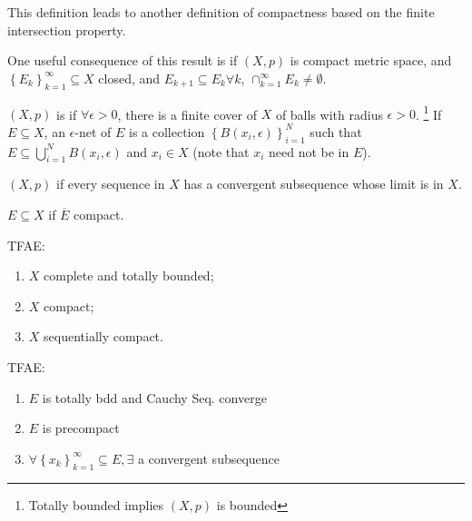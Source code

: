 \begin{rem}
    This definition leads to another definition of compactness 
    based on the finite intersection property.
\end{rem}

One useful consequence of this result is if $(X, p)$ is compact metric space, and 
$\left\{ E_k \right\}_{k = 1}^{\infty} \subseteq X$ closed, and $E_{k + 1} \subseteq E_k \forall k$, 
$\cap_{k = 1}^{\infty} E_k \neq \emptyset$.  

\begin{defn}
    $(X, p)$ is  if 
    $\forall \epsilon > 0$, there is a finite cover of $X$ of balls with radius $\epsilon > 0$.
    \footnote{Totally bounded implies $(X, p)$ is bounded}
    If $E \subseteq X$, an $\epsilon$-net of $E$ is a collection 
    $\left\{ B(x_i, \epsilon) \right\}^N_{i=1} $ such that 
    $E \subseteq \bigcup^N_{i=1} B(x_i, \epsilon)$ and $x_i \in X$ 
    (note that $x_i$ need not be in $E$).
\end{defn}

\begin{defn}
    $(X, p)$  if every sequence in $X$ has
    a convergent subsequence whose limit is in $X$. 
\end{defn}

\begin{defn}
    $E \subseteq X$  if $\overline{E}$ compact.   
\end{defn}

\begin{thm}
    TFAE:
    \begin{enumerate}
        \item $X$ complete and totally bounded;
        \item $X$ compact;
        \item $X$ sequentially compact.
    \end{enumerate}
\end{thm}

\begin{rem} TFAE:
    \begin{enumerate}
        \item $E$ is totally bdd and Cauchy Seq. converge
        \item $E$ is precompact
        \item $\forall \left\{ x_k \right\}_{k = 1}^{\infty} \subseteq E, \exists$ a convergent subsequence   
    \end{enumerate}

\end{rem}  

